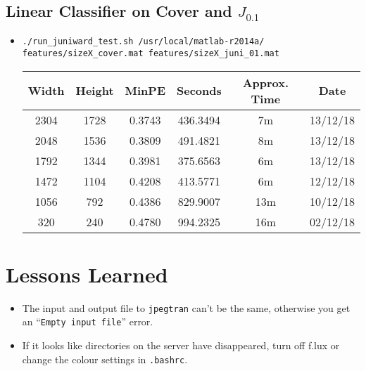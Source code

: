 \documentclass[11pt,a4paper]{report}
\newcommand{\Jtern}{\texorpdfstring{$J_{0.1}$}{J(0.1)}}
\begin{document}
\subsection{Linear Classifier on Cover and \Jtern}
\begin{itemize}
\item \texttt{./run\_juniward\_test.sh /usr/local/matlab-r2014a/} \\
         \texttt{features/sizeX\_cover.mat features/sizeX\_juni\_01.mat}
  \begin{center}
  \begin{tabular}{ c c | c | c c c }
  Width & Height & MinPE & Seconds & Approx. Time & Date \\ \hline
  2304 & 1728 & 0.3743 & 436.3494 & 7m & 13/12/18 \\
  2048 & 1536 & 0.3809 & 491.4821 & 8m & 13/12/18 \\
  1792 & 1344 & 0.3981 & 375.6563 & 6m & 13/12/18 \\
  1472 & 1104 & 0.4208 & 413.5771 & 6m & 12/12/18 \\
  1056 & 792 & 0.4386 & 829.9007 & 13m & 10/12/18 \\
  320 & 240 & 0.4780 & 994.2325 & 16m & 02/12/18 \\
  \end{tabular}
  \end{center}
\end{itemize}


\section{Lessons Learned}
\label{sec:lessons-learned}

\begin{itemize}

\item The input and output file to \texttt{jpegtran} can't be the same, otherwise you get an ``\texttt{Empty input file}'' error.

\item If it looks like directories on the server have disappeared, turn off f.lux or change the colour settings in \texttt{.bashrc}.

\end{itemize}
\end{document}
